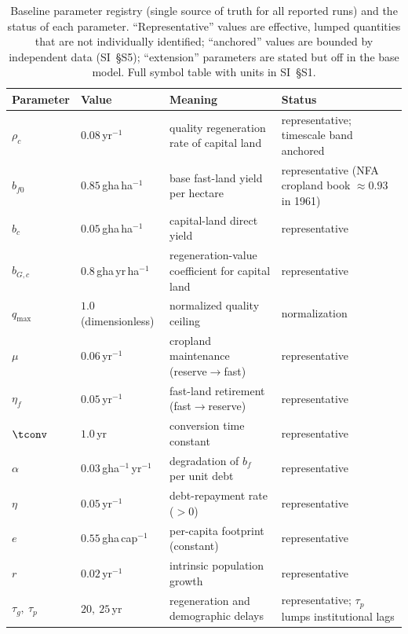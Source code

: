 \begin{table}[!htbp]
\centering\footnotesize
\caption{Baseline parameter registry (single source of truth for all reported runs) and the status of each parameter. ``Representative'' values are effective, lumped quantities that are not individually identified; ``anchored'' values are bounded by independent data (SI~\S S5); ``extension'' parameters are stated but off in the base model. Full symbol table with units in SI~\S S1.}
\label{tab:params}
\setlength{\tabcolsep}{4pt}
\begin{tabularx}{\textwidth}{@{}>{\raggedright\arraybackslash}p{} >{\raggedright\arraybackslash}p{} >{\raggedright\arraybackslash}X >{\raggedright\arraybackslash}p{}@{}}
\toprule
Parameter & Value & Meaning & Status \\
\midrule
$\rho_c$ & $0.08$\,yr$^{-1}$ & quality regeneration rate of capital land & representative; timescale band anchored \\
$b_{f0}$ & $0.85$\,gha\,ha$^{-1}$ & base fast-land yield per hectare & representative (NFA cropland book $\approx0.93$ in 1961) \\
$b_c$ & $0.05$\,gha\,ha$^{-1}$ & capital-land direct yield & representative \\
$b_{G,c}$ & $0.8$\,gha\,yr\,ha$^{-1}$ & regeneration-value coefficient for capital land & representative \\
$q_{\max}$ & $1.0$ (dimensionless) & normalized quality ceiling & normalization \\
$\mu$ & $0.06$\,yr$^{-1}$ & cropland maintenance (reserve$\to$fast) & representative \\
$\eta_f$ & $0.05$\,yr$^{-1}$ & fast-land retirement (fast$\to$reserve) & representative \\
$\tconv$ & $1.0$\,yr & conversion time constant & representative \\
$\alpha$ & $0.03$\,gha$^{-1}$\,yr$^{-1}$ & degradation of $b_f$ per unit debt & representative \\
$\eta$ & $0.05$\,yr$^{-1}$ & debt-repayment rate ($>0$) & representative \\
$e$ & $0.55$\,gha\,cap$^{-1}$ & per-capita footprint (constant) & representative \\
$r$ & $0.02$\,yr$^{-1}$ & intrinsic population growth & representative \\
$\tau_g,\ \tau_p$ & $20,\ 25$\,yr & regeneration and demographic delays & representative; $\tau_p$ lumps institutional lags \\

\end{tabularx}
\end{table}
